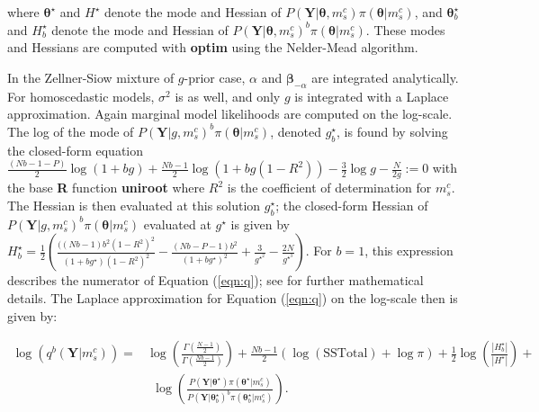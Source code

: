 \noindent where $\boldsymbol{\theta}^{\star}$ and $H^{\star}$ denote the mode and Hessian of $P(\boldsymbol{Y}|\boldsymbol{{\theta}},m_s^c)\pi(\boldsymbol{\theta}|m_s^c)$, and $\boldsymbol{\theta}^{\star}_b$ and $H^{\star}_b$ denote the mode and Hessian of $P(\boldsymbol{Y}|\boldsymbol{{\theta}},m_s^c)^b\pi(\boldsymbol{\theta}|m_s^c)$. These modes and Hessians are computed with \textbf{optim} using the Nelder-Mead algorithm. 

In the Zellner-Siow mixture of  $g$-prior case, $\alpha$ and $\boldsymbol{\beta}_{-\alpha}$ are integrated analytically. For homoscedastic models, $\sigma^2$ is as well, and only $g$ is integrated with a Laplace approximation. Again marginal model likelihoods are computed on the log-scale. The log of the mode of $P(\boldsymbol{Y}|g,m_s^c)^b\pi(\boldsymbol{\theta}|m_s^c)$, denoted $g^{\star}_b$, is found by solving the closed-form equation $\frac{(Nb-1-P)}{2}\log(1+bg) + \frac{Nb-1}{2}\log(1+bg(1-R^2))-\frac{3}{2}\log g-\frac{N}{2g}:=0$ with the base \textbf{R} function \textbf{uniroot} where $R^2$ is the coefficient of determination for $m_s^c$. The Hessian is then evaluated at this solution $g^{\star}_b$; the closed-form Hessian of $P(\boldsymbol{Y}|g,m_s^c)^b\pi(\boldsymbol{\theta}|m_s^c)$ evaluated at $g^{\star}$ is given by $H^{\star}_b=\frac{1}{2}\left(\frac{((Nb-1)b^2(1-R^2)^2}{(1+bg^{\star})(1-R^2)^2}-\frac{(Nb-P-1)b^2}{(1+bg^{\star})^2}+\frac{3}{g^{\star^2}} - \frac{2N}{g^{\star^3}} \right)$. For $b=1$, this expression describes the numerator of Equation (\ref{eqn:q}); see \citet{Liangetal} for further mathematical details. The Laplace approximation for Equation (\ref{eqn:q}) on the log-scale then is given by:

\begin{equation}
\begin{split}
\log\left(q^b(\boldsymbol{Y}|m_s^c)\right)=&\log\left(\frac{\Gamma\left(\frac{N-1}{2}\right)}{\Gamma\left(\frac{Nb-1}{2}\right)}\right)+\frac{Nb-1}{2}\left(\log(\text{SSTotal})+\log\pi\right)+ \frac{1}{2}\log\left(\frac{|H_b^{\star}|}{|H^{{\star}}|}\right) + \\
& \ \ \log\left(\frac{P(\boldsymbol{Y}|\boldsymbol{\theta}^{{\star}})\pi(\boldsymbol{\theta}^{\star}|m_s^c)}{P(\boldsymbol{Y}|\boldsymbol{\theta}_b^{{\star}})^b\pi(\boldsymbol{\theta}^{\star}_b|m_s^c)}\right).
\end{split}
\end{equation}

